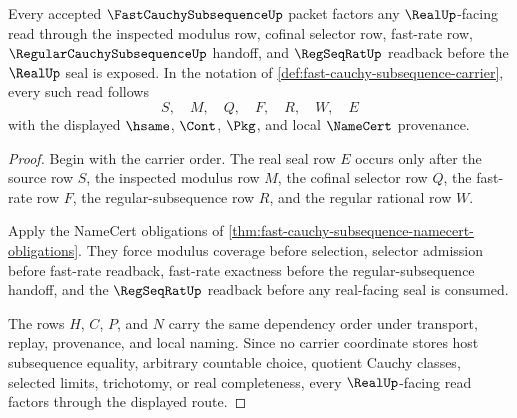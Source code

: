 \begin{theorem}
\label{thm:fast-cauchy-subsequence-regular-route}
Every accepted $\FastCauchySubsequenceUp$ packet factors any $\RealUp$-facing read through the inspected modulus row, cofinal selector row, fast-rate row, $\RegularCauchySubsequenceUp$ handoff, and $\RegSeqRatUp$ readback before the $\RealUp$ seal is exposed. In the notation of \autoref{def:fast-cauchy-subsequence-carrier}, every such read follows
$$
S,\quad M,\quad Q,\quad F,\quad R,\quad W,\quad E
$$
with the displayed $\hsame$, $\Cont$, $\Pkg$, and local $\NameCert$ provenance.
\end{theorem}
\begin{proof}
Begin with the carrier order. The real seal row $E$ occurs only after the source row $S$, the inspected modulus row $M$, the cofinal selector row $Q$, the fast-rate row $F$, the regular-subsequence row $R$, and the regular rational row $W$.

Apply the NameCert obligations of \autoref{thm:fast-cauchy-subsequence-namecert-obligations}. They force modulus coverage before selection, selector admission before fast-rate readback, fast-rate exactness before the regular-subsequence handoff, and the $\RegSeqRatUp$ readback before any real-facing seal is consumed.

The rows $H$, $C$, $P$, and $N$ carry the same dependency order under transport, replay, provenance, and local naming. Since no carrier coordinate stores host subsequence equality, arbitrary countable choice, quotient Cauchy classes, selected limits, trichotomy, or real completeness, every $\RealUp$-facing read factors through the displayed route.
\end{proof}

